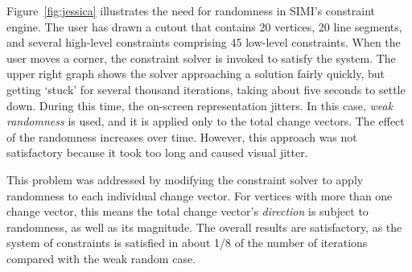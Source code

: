 

Figure~\ref{fig:jessica} illustrates the need for randomness in SIMI's
constraint engine. The user has drawn a cutout that contains 20
vertices, 20 line segments, and several high-level constraints
comprising 45 low-level constraints. When the user moves a corner, the
constraint solver is invoked to satisfy the system. The upper right
graph shows the solver approaching a solution fairly quickly, but
getting `stuck' for several thousand iterations, taking about five
seconds to settle down. During this time, the on-screen representation
jitters. In this case, \textit{weak randomness} is used, and it is
applied only to the total change vectors. The effect of the randomness
increases over time. However, this approach was not satisfactory
because it took too long and caused visual jitter.

This problem was addressed by modifying the constraint solver to apply
randomness to each individual change vector. For vertices with more
than one change vector, this means the total change vector's
\textit{direction} is subject to randomness, as well as its
magnitude. The overall results are satisfactory, as the system of
constraints is satisfied in about 1/8 of the number of iterations
compared with the weak random case.

